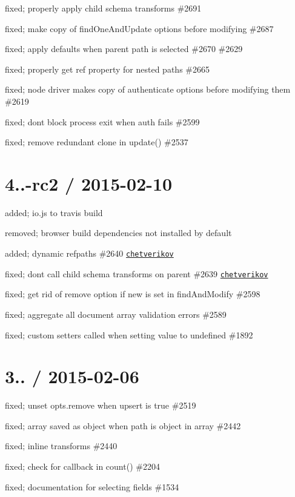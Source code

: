 \begin{DoxyItemize}
\item fixed; properly apply child schema transforms \#2691
\item fixed; make copy of find\+One\+And\+Update options before modifying \#2687
\item fixed; apply defaults when parent path is selected \#2670 \#2629
\item fixed; properly get ref property for nested paths \#2665
\item fixed; node driver makes copy of authenticate options before modifying them \#2619
\item fixed; dont block process exit when auth fails \#2599
\item fixed; remove redundant clone in update() \#2537
\end{DoxyItemize}

\section*{4..-\/rc2 / 2015-\/02-\/10 }


\begin{DoxyItemize}
\item added; io.\+js to travis build
\item removed; browser build dependencies not installed by default
\item added; dynamic refpaths \#2640 \href{https://github.com/chetverikov}{\tt chetverikov}
\item fixed; dont call child schema transforms on parent \#2639 \href{https://github.com/chetverikov}{\tt chetverikov}
\item fixed; get rid of remove option if new is set in find\+And\+Modify \#2598
\item fixed; aggregate all document array validation errors \#2589
\item fixed; custom setters called when setting value to undefined \#1892
\end{DoxyItemize}

\section*{3.. / 2015-\/02-\/06 }


\begin{DoxyItemize}
\item fixed; unset opts.\+remove when upsert is true \#2519
\item fixed; array saved as object when path is object in array \#2442
\item fixed; inline transforms \#2440
\item fixed; check for callback in count() \#2204
\item fixed; documentation for selecting fields \#1534
\end{DoxyItemize}

